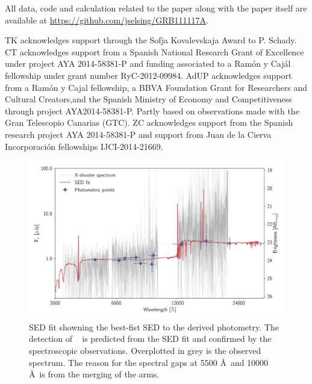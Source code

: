 \documentclass{aa}    %
\begin{document}
All data, code and calculation related to the paper along with the
paper itself are available at \url{https://github.com/jselsing/GRB111117A}.

\begin{acknowledgements}
TK acknowledges support through the Sofja Kovalevskaja Award to P. Schady. 
CT acknowledges support from a Spanish National Research Grant of Excellence under project AYA 2014-58381-P and funding associated to a Ramón y Cajál fellowship under grant number RyC-2012-09984.
AdUP acknowledges support from a Ramón y Cajal fellowship, a BBVA Foundation Grant for Researchers and Cultural Creators,and the Spanish Ministry of Economy and Competitiveness through project AYA2014-58381-P.
Partly based on observations made with the Gran Telescopio Canarias (GTC).
ZC acknowledges support from the Spanish research project AYA 2014-58381-P and support from Juan de la Cierva Incorporaci\'on fellowships IJCI-2014-21669. 

\end{acknowledgements}




\newpage





 \begin{figure}
 	\centering
 	\includegraphics[width=16cm]{figures/SEDspecphot.pdf}
 	\caption{SED fit showning the best-fist SED to the derived photometry. The detection of \lya~ is predicted from the SED fit and confirmed by the spectroscopic observations. Overplotted in grey is the observed spectrum. The reason for the spectral gaps at 5500 \AA~and 10000 \AA~is from the merging of the arms.}
 	\label{fig:SED}
 \end{figure}
\end{document}
